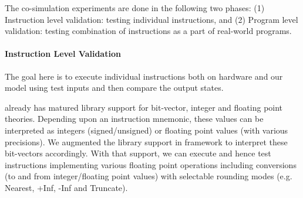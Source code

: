 The co-simulation experiments are done in the following two phases: (1) Instruction level validation: testing individual instructions, and (2) Program level validation: testing combination of instructions  as a part of real-world programs. 

\paragraph{Instruction Level Validation}
The goal here is to execute individual instructions both on hardware and our model using test inputs and then compare the output states. 

\K already has matured library support for bit-vector, integer and floating point theories.  Depending upon an instruction mnemonic, these values can be interpreted as integers (signed/unsigned) or floating point values (with various precisions).  We augmented the library support in \K framework to interpret these bit-vectors accordingly. With that support, we can execute and hence test instructions implementing various floating point operations including conversions (to and from integer/floating point values) with selectable rounding modes (e.g. Nearest, +Inf, -Inf and Truncate).   

